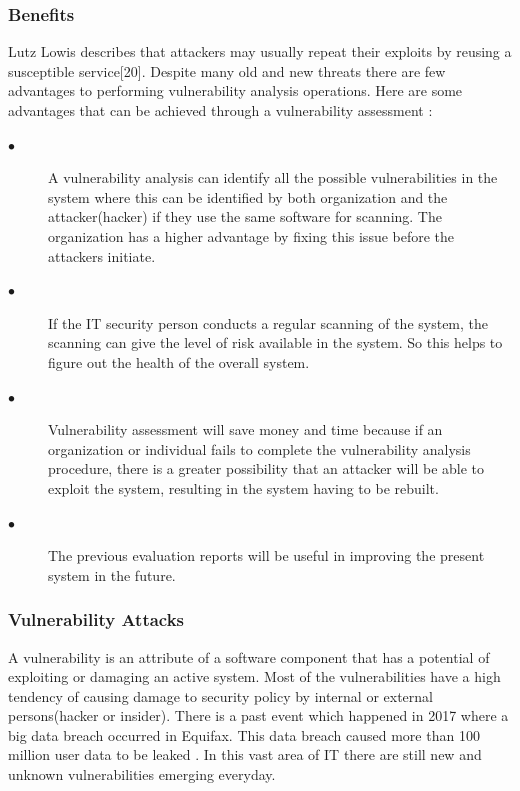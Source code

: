 \subsubsection{Benefits}
Lutz Lowis describes that attackers may usually repeat their exploits by reusing a susceptible service[20]. Despite many old and new threats there are few advantages to performing vulnerability analysis operations. Here are some advantages that can be achieved through a vulnerability assessment \cite{LoAc2011} \cite{Rh2019} \cite{VulTest}:
\begin{description}
	\item [$\bullet$]A vulnerability analysis can identify all the possible vulnerabilities in the system where this can be identified by both organization and the attacker(hacker) if they use the same software for scanning. The organization has a higher advantage by fixing this issue before the attackers initiate. 
	
	\item [$\bullet$]If the IT security person conducts a regular scanning of the system, the scanning can give the level of risk available in the system. So this helps to figure out the health of the overall system.
	
	\item [$\bullet$]Vulnerability assessment will save money and time because if an organization or individual fails to complete the vulnerability analysis procedure, there is a greater possibility that an attacker will be able to exploit the system, resulting in the system having to be rebuilt.
	
	\item [$\bullet$]The previous evaluation reports will be useful in improving the present system in the future.
\end{description}
\subsubsection{Vulnerability Attacks}
A vulnerability is an attribute of a software component that has a potential of exploiting or damaging an active system. Most of the vulnerabilities have a high tendency of causing damage to security policy by internal or external persons(hacker or insider). There is a past event which happened in 2017 where a big data breach occurred in Equifax. This data breach caused more than 100 million user data to be leaked \cite{Gilad}. In this vast area of IT there are still new and unknown vulnerabilities emerging everyday.
